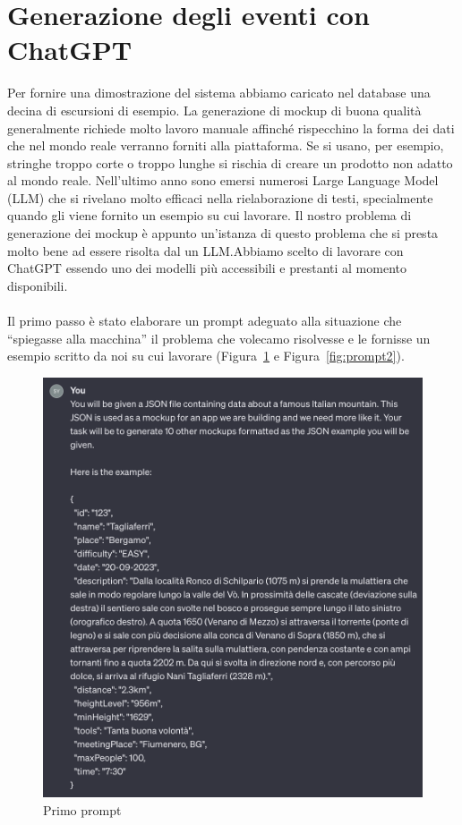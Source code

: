 \section{Generazione degli eventi con ChatGPT}
Per fornire una dimostrazione del sistema abbiamo caricato nel database una decina di escursioni di esempio.
La generazione di mockup di buona qualità generalmente richiede molto lavoro manuale affinché rispecchino la forma dei dati
che nel mondo reale verranno forniti alla piattaforma. Se si usano, per esempio, stringhe troppo corte o troppo lunghe si rischia di creare
un prodotto non adatto al mondo reale.
Nell'ultimo anno sono emersi numerosi Large Language Model (LLM) che si rivelano molto efficaci nella rielaborazione di testi, specialmente quando gli viene 
fornito un esempio su cui lavorare. Il nostro problema di generazione dei mockup è appunto un'istanza di questo problema che si presta molto bene ad essere
risolta dal un LLM\@.Abbiamo scelto di lavorare con ChatGPT essendo uno dei modelli più accessibili e prestanti al momento disponibili.\\ \\
Il primo passo è stato elaborare un prompt adeguato alla situazione che ``spiegasse alla macchina'' il problema che volecamo risolvesse e le fornisse un esempio
scritto da noi su cui lavorare (Figura~\ref*{fig:prompt1} e Figura~\ref*{fig:prompt2}).
\begin{figure}[ht]
  \includegraphics[width=\linewidth]{images/prompt1.png}
  \caption{Primo prompt}\label{fig:prompt1}
\end{figure}
